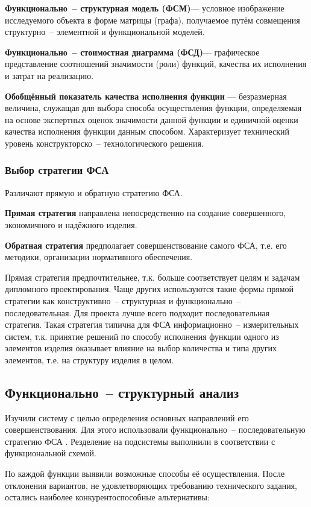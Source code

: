 \textbf{Функционально~-- структурная модель (ФСМ)}--- условное изображение
исследуемого объекта в форме матрицы (графа),
получаемое путём совмещения структурно~-- элементной и функциональной моделей.

\textbf{Функционально~-- стоимостная диаграмма (ФСД)}--- графическое
представление соотношений значимости (роли) функций, качества их
исполнения и затрат на реализацию.

\textbf{Обобщённый показатель качества исполнения функции}
--- безразмерная величина, служащая для выбора способа осуществления функции,
определяемая на основе экспертных оценок значимости данной функции и единичной
оценки качества исполнения функции данным способом.
Характеризует технический уровень конструкторско~-- технологического решения.

\subsubsection{Выбор стратегии ФСА}
Различают прямую и обратную стратегию ФСА.

\textbf{Прямая стратегия}
направлена непосредственно на создание совершенного, экономичного и надёжного
изделия.

\textbf{Обратная стратегия}
предполагает совершенствование самого ФСА, т.е. его методики, организации
нормативного обеспечения.

Прямая стратегия предпочтительнее, т.к. больше соответствует целям и задачам
дипломного проектирования.
Чаще других используются такие формы прямой стратегии как
конструктивно~-- структурная и функционально~-- последовательная.
Для проекта лучше всего подходит последовательная стратегия.
Такая стратегия типична для ФСА информационно~-- измерительных систем, т.к.
принятие решений по способу исполнения функции одного из элементов изделия
оказывает влияние на выбор количества и типа других элементов, т.е. на структуру
изделия в целом.

\newpage
\subsection{Функционально~-- структурный анализ}
Изучили систему с целью определения основных направлений его совершенствования.
Для этого использовали функционально~-- последовательную стратегию ФСА
\cite[стр. 11]{econ_FSA}.
Резделение на подсистемы выполнили в соответствии с функциональной схемой.

По каждой функции выявили возможные способы её осуществления.
После отклонения вариантов, не удовлетворяющих требованию технического
задания, остались наиболее конкурентоспособные альтернативы:

